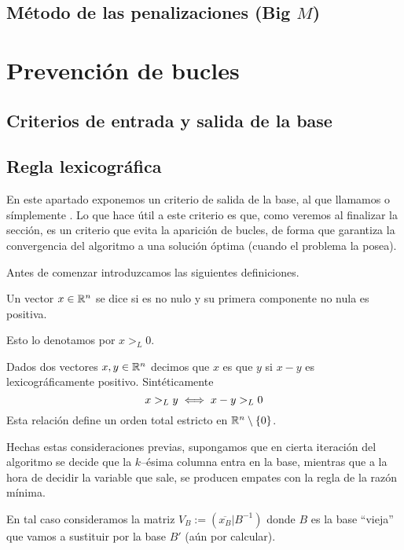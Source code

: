 \subsection{Método de las penalizaciones (Big $M$)}
\section{Prevención de bucles}
\subsection{Criterios de entrada y salida de la base}
\subsection{Regla lexicográfica}
En este apartado exponemos un criterio de salida de la base, al que llamamos  o símplemente . Lo que hace útil a este criterio es que, como veremos al finalizar la sección, es un criterio que evita la aparición de bucles, de forma que garantiza la convergencia del algoritmo a una solución óptima (cuando el problema la posea).

Antes de comenzar introduzcamos las siguientes definiciones.
\begin{defi}
	Un vector $x\in\mathbb{R}^n$ se dice  si es no nulo y su primera componente no nula es positiva.
	
	Esto lo denotamos por $x>_L0$.
\end{defi}
\begin{defi}
	Dados dos vectores $x,y\in\mathbb{R}^n$ decimos que $x$ es  que $y$ si $x-y$ es lexicográficamente positivo. Sintéticamente
	\begin{equation*}
		x>_Ly\iff x-y>_L0
	\end{equation*}
	Esta relación define un orden total estricto en $\mathbb{R}^n\setminus\{0\}$.
\end{defi}
Hechas estas consideraciones previas, supongamos que en cierta iteración del algoritmo se decide que la $k$--ésima columna entra en la base, mientras que a la hora de decidir la variable que sale, se producen empates con la regla de la razón mínima.

En tal caso consideramos la matriz $V_B:=(\overline{x_B}|B^{-1})$ donde $B$ es la base ``vieja'' que vamos a sustituir por la base $B'$ (aún por calcular).

